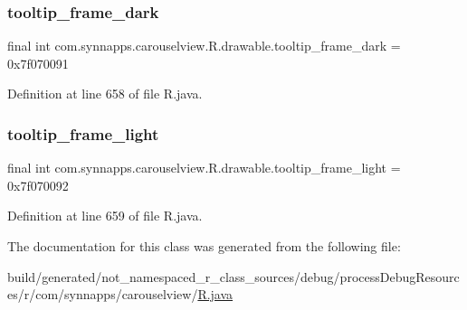 \subsubsection{\texorpdfstring{tooltip\_frame\_dark}{tooltip\_frame\_dark}}
{\footnotesize\ttfamily final int com.\+synnapps.\+carouselview.\+R.\+drawable.\+tooltip\+\_\+frame\+\_\+dark = 0x7f070091\hspace{0.3cm}{\ttfamily [static]}}



Definition at line 658 of file R.\+java.

\mbox{\label{classcom_1_1synnapps_1_1carouselview_1_1_r_1_1drawable_a78fe30cf04c463f9c93e80544eba061f}} 
\subsubsection{\texorpdfstring{tooltip\_frame\_light}{tooltip\_frame\_light}}
{\footnotesize\ttfamily final int com.\+synnapps.\+carouselview.\+R.\+drawable.\+tooltip\+\_\+frame\+\_\+light = 0x7f070092\hspace{0.3cm}{\ttfamily [static]}}



Definition at line 659 of file R.\+java.



The documentation for this class was generated from the following file\+:\begin{DoxyCompactItemize}
\item 
build/generated/not\+\_\+namespaced\+\_\+r\+\_\+class\+\_\+sources/debug/process\+Debug\+Resources/r/com/synnapps/carouselview/\mbox{\hyperlink{com_2synnapps_2carouselview_2_r_8java}{R.\+java}}\end{DoxyCompactItemize}

